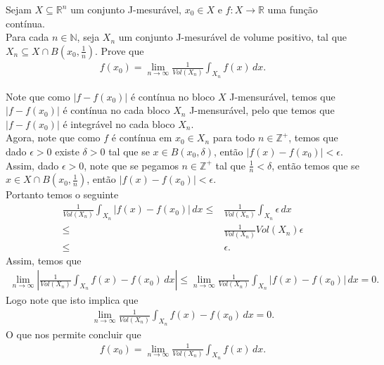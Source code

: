 \begin{homeworkProblem}[Seção 3-6]
  Sejam $X\subseteq \mathbb{R}^{n}$ um conjunto J-mesurável, $x_0\in X$ e $f:X\to\mathbb{R}$ uma função contínua.\\
  Para cada $n\in\mathbb{N}$, seja $X_n$ um conjunto J-mesurável de volume positivo, tal que $X_n\subseteq X\cap B(x_0,\frac{1}{n})$. Prove que
  \begin{align*}
    f(x_0)=\lim_{n \to \infty}\frac{1}{Vol(X_n)}\int_{X_n}f(x)\,dx.
  \end{align*}
  \begin{solution}
    Note que como $|f-f(x_0)|$ é contínua no bloco $X$ J-mensurável, temos que $|f-f(x_0)|$ é contínua no cada bloco $X_n$ J-mensurável, pelo que temos que $|f-f(x_0)|$ é integrável no cada bloco $X_n$.\\
    Agora, note que como $f$ é contínua em $x_0\in X_n$ para todo $n\in\mathbb{Z}^{+}$, temos que dado $\epsilon>0$ existe $\delta>0$ tal que se $x\in B(x_0,\delta)$, então $|f(x)-f(x_0)|<\epsilon$.\\
    Assim, dado $\epsilon>0$, note que se pegamos $n\in \mathbb{Z}^{+}$ tal que $\frac{1}{n}<\delta$, então temos que se $x\in X\cap B(x_0,\frac{1}{n})$, então $|f(x)-f(x_0)|<\epsilon$.\\
    Portanto temos o seguinte
    \begin{align*}
      \frac{1}{Vol(X_n)}\int_{X_n}|f(x)-f(x_0)|\,dx\leq &\frac{1}{Vol(X_n)}\int_{X_n}\epsilon\,dx\\
      \leq&\frac{1}{Vol(X_n)}Vol(X_n)\epsilon\\
      \leq& \epsilon.
    \end{align*}
    Assim, temos que
    \begin{align*}
      \lim_{n \to \infty}\left| \frac{1}{Vol(X_n)}\int_{X_n}f(x)-f(x_0)\,dx \right|\leq \lim_{n \to \infty}\frac{1}{Vol(X_n)}\int_{X_n}|f(x)-f(x_0)|\,dx=0.
    \end{align*}
    Logo note que isto implica que
    \begin{align*} 
      \lim_{n \to \infty}\frac{1}{Vol(X_n)}\int_{X_n}f(x)-f(x_0)\,dx=0.
    \end{align*}
    O que nos permite concluir que
    \begin{align*}
      f(x_0)=\lim_{n \to \infty}\frac{1}{Vol(X_n)}\int_{X_n}f(x)\,dx.
    \end{align*}
  \end{solution}
\end{homeworkProblem}
